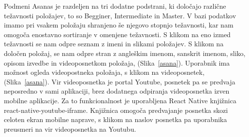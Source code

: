 \documentclass[a4paper, 12pt]{book}
\begin{document}
Podmeni Asanas je razdeljen na tri dodatne podstrani, ki določajo različne težavnosti položajev, to so Begginer, Intermediate in Master. V bazi podatkov imamo pri vsakem položaju shranjeno še njegovo stopnjo težavnosti, kar nam omogoča enostavno sortiranje v omenjene težavnosti. S klikom na eno izmed težavnosti se nam odpre seznam z imeni in slikami položajev. S klikom na določen položaj, se nam odpre stran z angleškim imenom, sanskrit imenom, sliko, opisom izvedbe in videoposnetkom položaja, (Slika~\ref{asana}). Uporabnik ima možnost ogleda videopostneka položaja, s klikom na videoposnetek, (Slika~\ref{asana}). Vir videoposnetka je portal Youtube, posnetek pa se predvaja neposredno v sami aplikaciji, brez dodatnega odpiranja videoposnetka izven mobilne aplikacije. Za to funkcionalnost je uporabljena React Native knjižnica react-native-youtube-iframe. Knjižnica omogoča predvajanje posnetka skozi celoten ekran mobilne naprave, s klikom na naslov posnetka pa uporabnika preusmeri na vir videoposnetka na Youtubu.\\
\end{document}
